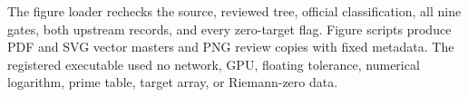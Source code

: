 \documentclass[11pt]{article}
\theoremstyle{definition}
\theoremstyle{remark}
\begin{document}
The figure loader rechecks the source, reviewed tree, official
classification, all nine gates, both upstream records, and every zero-target
flag.  Figure scripts produce PDF and SVG vector masters and PNG review
copies with fixed metadata.  The registered executable used no network, GPU,
floating tolerance, numerical logarithm, prime table, target array, or
Riemann-zero data.



\end{document}
